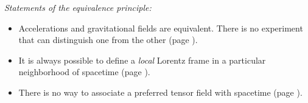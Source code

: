 \documentclass{genrel}
\begin{document}
\emph{Statements of the equivalence principle:}\\\label{equivalence-principle-summary}
\begin{itemize}
\item[] Accelerations and gravitational fields are equivalent. There is no experiment that can distinguish one from
the other (page \pageref{equivalence-a-and-g}).
\item[] It is always possible to define a \emph{local} Lorentz
frame in a particular neighborhood of spacetime (page \pageref{equivalence-locally-lorentzian}).
\item[] There is no way to associate a preferred tensor field with spacetime (page \pageref{equivalence-no-preferred-field}).
\end{itemize}
\end{document}
